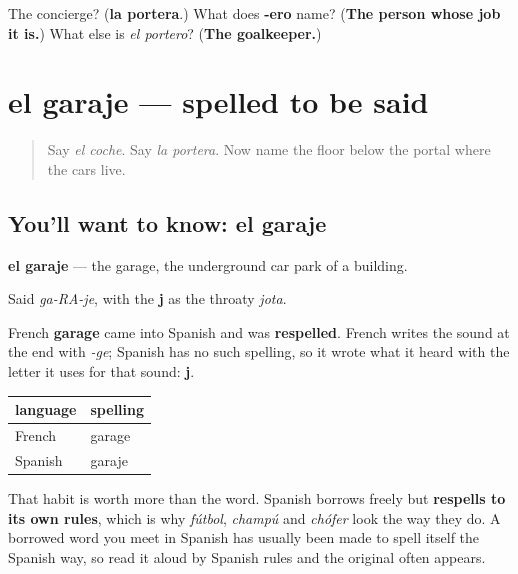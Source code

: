 \begin{tcolorbox}[breakable,colback=teal!4,colframe=teal!35!black,title={Before you move on}]
The concierge? (\textbf{la portera}.) What does \textbf{-ero} name? (\textbf{The person whose job it is.}) What else is \emph{el portero}? (\textbf{The goalkeeper.})
\end{tcolorbox}
\section[el garaje]{el garaje — spelled to be said}

\label{lesson:ES-C433-garaje}



\begin{quote}
Say \emph{el coche}. Say \emph{la portera}. Now name the floor below the portal where the cars live.
\end{quote}

\subsection*{You'll want to know: el garaje}
\textbf{el garaje} — the garage, the underground car park of a building.

Said \emph{ga-RA-je}, with the \textbf{j} as the throaty \emph{jota}.

\begin{cousinweb}
French \textbf{garage} came into Spanish and was \textbf{respelled}. French writes the sound at the end with \emph{-ge}; Spanish has no such spelling, so it wrote what it heard with the letter it uses for that sound: \textbf{j}.

\noindent
\begin{tabularx}{\linewidth}{@{}>{\raggedright\arraybackslash}X>{\raggedright\arraybackslash}X@{}}
\toprule
\textbf{language} & \textbf{spelling} \\
\midrule
French & garage \\
Spanish & garaje \\
\bottomrule
\end{tabularx}

That habit is worth more than the word. Spanish borrows freely but \textbf{respells to its own rules}, which is why \emph{fútbol}, \emph{champú} and \emph{chófer} look the way they do. A borrowed word you meet in Spanish has usually been made to spell itself the Spanish way, so read it aloud by Spanish rules and the original often appears.
\end{cousinweb}

